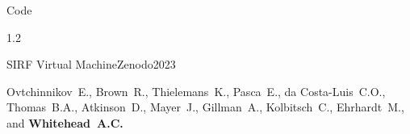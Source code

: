 \documentclass{cv}
\begin{document}
\begin{rSection}{Code}
        \vspace{-0.5cm}
        \begin{spacing}{1.2}
            \item \begin{rSubsection}{SIRF Virtual Machine}{}{Zenodo}{2023}
                \vspace{-0.25cm}
                \item Ovtchinnikov~E., Brown~R., Thielemans~K., Pasca~E., da Costa-Luis~C.O., Thomas~B.A., Atkinson~D., Mayer~J., Gillman~A., Kolbitsch~C., Ehrhardt~M., and \textbf{Whitehead~A.C.}
            \end{rSubsection}
        \end{spacing}
    \end{rSection}
\end{document}

